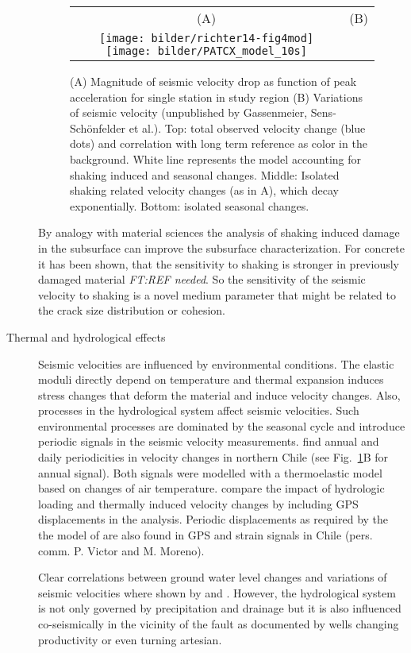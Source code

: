 \documentclass[11pt]{article}
\newcommand{\noteft}[1]{{\it \color{magenta} FT:#1}}
\newcommand{\noteft}[1]{}
\begin{document}
\begin{description}
\begin{figure}
\begin{tabular}{cc}
(A) & (B) \\ 
\texttt{[image: bilder/richter14-fig4mod]} \texttt{[image: bilder/PATCX\_model\_10s]} 
\end{tabular}
\caption{\footnotesize (A) Magnitude of seismic velocity drop as function of peak acceleration for single station in study region 
\citep{Richter2014}
(B) Variations of seismic velocity  (unpublished by Gassenmeier, Sens-Schönfelder et al.). Top: total observed velocity change (blue dots) and correlation with long term reference as color in the background. White line represents the model accounting for shaking induced and seasonal changes. Middle: Isolated shaking related velocity changes (as in A), which decay exponentially. Bottom: isolated seasonal changes. }
\label{fig:PATCX}
\end{figure}

By analogy with material sciences the analysis of shaking induced damage in the subsurface can  improve the subsurface characterization. For concrete it has been shown, that the sensitivity  to shaking is stronger in previously damaged material\noteft{REF needed}. So the sensitivity of the seismic velocity to shaking is a novel medium parameter that might be related to the crack size distribution or cohesion.%

 
 \item[Thermal and hydrological effects]
Seismic velocities are influenced by environmental conditions. The elastic moduli directly depend on temperature and thermal expansion induces stress changes that deform the material and induce velocity changes. Also, processes in the hydrological system affect seismic velocities. Such environmental processes are dominated by the seasonal cycle and introduce periodic signals in the seismic velocity measurements. \citet{Richter2014} find annual and daily periodicities in velocity changes in northern Chile (see Fig.~\ref{fig:PATCX}B for annual signal). Both signals were modelled with a thermoelastic model based on changes of air temperature. \citet{tsai_JGR_11} compare the impact  of hydrologic loading and thermally induced velocity changes by including GPS displacements in the analysis. Periodic displacements as required by the the model of \citet{Richter2014} are also found in GPS and strain signals in Chile (pers. comm. P. Victor and M. Moreno).

Clear correlations between ground water level changes and variations of seismic velocities where shown by \citet{sens-schoenfelder_wegler_GRL_06} and \citet{Gassenmeier2014}. However, the hydrological system is not only governed by precipitation and drainage but it is also influenced co-seismically in the vicinity of the fault \citep{Jonsson2003} as documented by wells changing productivity or even turning artesian. 
\end{description}
\end{document}
